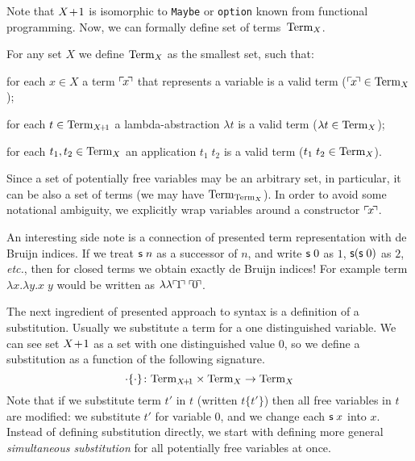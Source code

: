 Note that $X\!+\!1$ is isomorphic to \texttt{Maybe} or \texttt{option}
known from functional programming.
Now, we can formally define set of terms~$\mathrm{Term}_{X}$.

\begin{defin}
  For any set $X$ we define $\mathrm{Term}_{X}$ as the smallest set, such that:
  \begin{thmenumerate}
  \item for each $x \in X$ a term $\ulcorner\! x \!\urcorner$ that represents a variable
    is a valid term ($\ulcorner\! x \!\urcorner \in \mathrm{Term}_{X}$);
  \item for each $t \in \mathrm{Term}_{X\!+\!1}$
    a lambda-abstraction $\lambda t$ is a valid term ($\lambda t \in \mathrm{Term}_{X}$);
  \item for each $t_1,t_2 \in \mathrm{Term}_{X}$ an application $t_1\;t_2$
    is a valid term ($t_1\;t_2 \in \mathrm{Term}_{X}$).
  \end{thmenumerate}
\end{defin}

Since a set of potentially free variables may be an arbitrary set,
in particular, it can be also a set of terms (we may have $\mathrm{Term}_{\mathrm{Term}_{X}}$).
In order to avoid some notational ambiguity, we explicitly wrap variables around
a constructor $\ulcorner\! x \!\urcorner$.

An interesting side note is a connection of presented term representation with
de Bruijn indices.
If we treat $\mathsf{s}\;n$ as a successor of $n$, and write $\mathsf{s}\;0$ as $1$,
$\mathsf{s}(\mathsf{s}\;0)$ as $2$, \emph{etc.},
then for closed terms we obtain exactly de Bruijn indices!
For example term $\lambda x.\lambda y. x\;y$
would be written as $\lambda\lambda \ulcorner\! 1 \!\urcorner\;\ulcorner\! 0 \!\urcorner$.

The next ingredient of presented approach to syntax is
a definition of a substitution.
Usually we substitute a term for a one distinguished variable.
We can see set $X\!+\!1$ as a set with one distinguished value $0$,
so we define a substitution as a function of the following signature.
\[
	\cdot\{\cdot\}\colon
  \mathrm{Term}_{X\!+\!1} \times \mathrm{Term}_{X} \to \mathrm{Term}_{X}
\]
Note that if we substitute term $t'$ in $t$ (written $t\{t'\}$)
then all free variables in $t$ are modified:
we substitute $t'$ for variable $0$,
and we change each $\mathsf{s}\;x$ into $x$.
Instead of defining substitution directly,
we start with defining more general \emph{simultaneous substitution}
for all potentially free variables at once.

